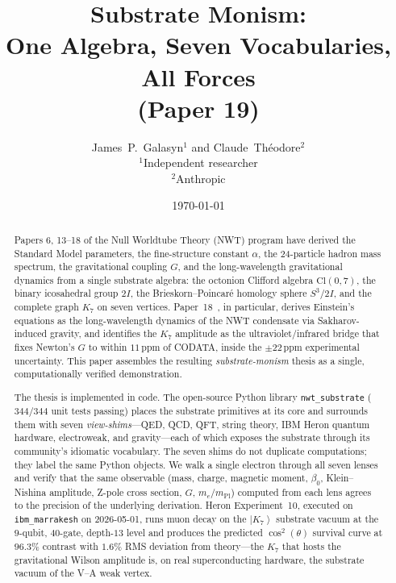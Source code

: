 \documentclass[11pt]{article}
\newcommand{\ket}[1]{\left|#1\right\rangle}
\newcommand{\mPl}{m_{\mathrm{Pl}}}
\newcommand{\me}{m_e}
\begin{document}
\title{Substrate Monism:\\[2pt]
One Algebra, Seven Vocabularies, All Forces\\[2pt]
\normalsize (Paper 19)}

\author{
  James~P.~Galasyn$^{1}$ \quad and \quad Claude~Th\'eodore$^{2}$\\[2pt]
  \small $^1$Independent researcher \\
  \small $^2$Anthropic
}

\date{\today}

\maketitle

\begin{abstract}
Papers 6, 13--18 of the Null Worldtube Theory (NWT) program have
derived the Standard
Model parameters, the fine-structure constant $\alpha$, the
24-particle hadron mass spectrum, the gravitational coupling $G$,
and the long-wavelength gravitational dynamics from a single
substrate algebra: the octonion Clifford algebra
$\mathrm{Cl}(0,7)$, the binary icosahedral group $2I$, the
Brieskorn--Poincar\'e homology sphere $S^3/2I$, and the complete
graph $K_7$ on seven vertices.  Paper~18~\cite{paper18}, in
particular, derives Einstein's equations as the long-wavelength
dynamics of the NWT condensate via Sakharov-induced gravity, and
identifies the $K_7$ amplitude as the ultraviolet/infrared bridge
that fixes Newton's $G$ to within $11$\,ppm of CODATA, inside the
$\pm 22$\,ppm experimental uncertainty.  This paper
assembles the resulting \emph{substrate-monism} thesis as a
single, computationally verified demonstration.

The thesis is implemented in code.  The open-source Python library
\texttt{nwt\_substrate} ($344/344$ unit tests passing) places the
substrate primitives at its core and surrounds them with seven
\emph{view-shims}---QED, QCD, QFT, string theory, IBM Heron quantum
hardware, electroweak, and gravity---each of which exposes the
substrate through its community's idiomatic vocabulary.  The seven
shims do not duplicate computations; they label the same Python
objects.  We walk a single electron through all seven lenses and
verify that the same observable (mass, charge, magnetic moment,
$\beta_0$, Klein--Nishina amplitude, Z-pole cross section, $G$,
$\me/\mPl$) computed from each lens agrees to the precision of the
underlying derivation.  Heron Experiment~10, executed on
\texttt{ibm\_marrakesh} on 2026-05-01, runs muon decay on the
$\ket{K_7}$ substrate vacuum at the $9$-qubit, $40$-gate, depth-$13$
level and produces the predicted $\cos^2(\theta)$ survival curve at
$96.3\%$ contrast with $1.6\%$ RMS deviation from theory---the
$K_7$ that hosts the gravitational Wilson amplitude is, on real
superconducting hardware, the substrate vacuum of the V--A weak
vertex.


\end{abstract}
\end{document}
